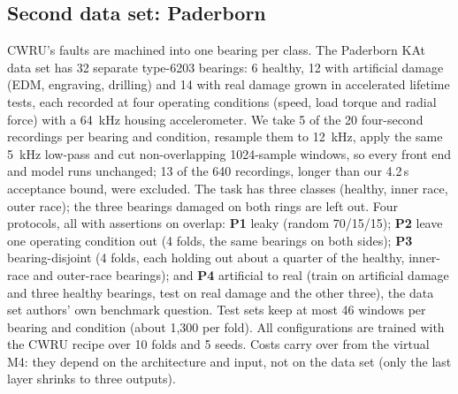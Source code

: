 \documentclass[conference]{IEEEtran}
\begin{document}
\subsection{Second data set: Paderborn}
\label{sec:pum}
CWRU's faults are machined into one bearing per class. The Paderborn KAt data set \cite{lessmeier2016condition} has
32 separate type-6203 bearings: 6 healthy, 12 with artificial damage (EDM, engraving, drilling) and 14 with real
damage grown in accelerated lifetime tests, each recorded at four operating conditions (speed, load torque and radial
force) with a \SI{64}{kHz} housing accelerometer. We take 5 of the 20 four-second recordings per bearing and condition,
resample them to \SI{12}{kHz}, apply the same \SI{5}{kHz} low-pass and cut non-overlapping 1024-sample windows, so
every front end and model runs unchanged; 13 of the 640 recordings, longer than our 4.2\,s acceptance bound, were
excluded. The task has three classes (healthy, inner race, outer race); the three bearings damaged on both rings are
left out. Four protocols, all with assertions on overlap: \textbf{P1} leaky (random 70/15/15); \textbf{P2} leave one
operating condition out (4 folds, the same bearings on both sides); \textbf{P3} bearing-disjoint (4 folds, each holding
out about a quarter of the healthy, inner-race and outer-race bearings); and \textbf{P4} artificial to real (train on
artificial damage and three healthy bearings, test on real damage and the other three), the data set authors'
own benchmark question. Test sets keep at most 46 windows per bearing and condition (about 1,300 per fold). All
\NumConfigs{} configurations are trained with the CWRU recipe over 10 folds and 5 seeds. Costs carry over from the
virtual M4: they depend on the architecture and input, not on the data set (only the last layer shrinks to three
outputs).
\end{document}
